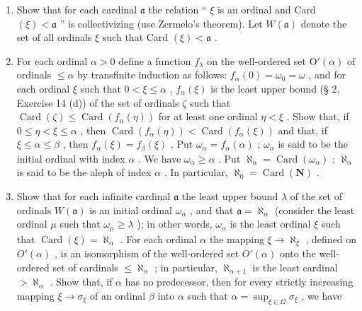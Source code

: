 \begin{enumerate}
\def\labelenumi{(\alph{enumi})}
\item
  Show that for each cardinal \(\mathfrak{a}\) the relation `` \(\xi\) is an ordinal and Card \((\xi) < \mathfrak{a}\) '' is collectivizing (use Zermelo's theorem). Let \(W(\mathfrak{a})\) denote the set of all ordinals \(\xi\) such that Card \((\xi) < \mathfrak{a}\) .
\item
  For each ordinal \(\alpha > 0\) define a function \(f_{\lambda}\) on the well-ordered set \(\mathrm{O}'(\alpha)\) of ordinals \(\leqslant \alpha\) by transfinite induction as follows: \(f_{\alpha}(0) = \omega_0 = \omega\) , and for each ordinal \(\xi\) such that \(0 < \xi \leqslant \alpha\) , \(f_{\alpha}(\xi)\) is the least upper bound (§ 2, Exercise 14 (d)) of the set of ordinals \(\zeta\) such that \(\operatorname{Card}(\zeta) \leqslant \operatorname{Card}(f_{\alpha}(\eta))\) for at least one ordinal \(\eta < \xi\) . Show that, if \(0 \leqslant \eta < \xi \leqslant \alpha\) , then \(\operatorname{Card}(f_{\alpha}(\eta)) < \operatorname{Card}(f_{\alpha}(\xi))\) and that, if \(\xi \leqslant \alpha \leqslant \beta\) , then \(f_{\alpha}(\xi) = f_{\beta}(\xi)\) . Put \(\omega_{\alpha} = f_{\alpha}(\alpha)\) ; \(\omega_{\alpha}\) is said to be the initial ordinal with index \(\alpha\) . We have \(\omega_{\alpha} \geqslant \alpha\) . Put \(\aleph_{\alpha} = \operatorname{Card}(\omega_{\alpha})\) ; \(\aleph_{\alpha}\) is said to be the aleph of index \(\alpha\) . In particular, \(\aleph_0 = \operatorname{Card}(\mathbf{N})\) .
\item
  Show that for each infinite cardinal \(\mathfrak{a}\) the least upper bound \(\lambda\) of the set of ordinals \(W(\mathfrak{a})\) is an initial ordinal \(\omega_{\alpha}\) , and that \(\mathfrak{a} = \aleph_{\alpha}\) (consider the least ordinal \(\mu\) such that \(\omega_{\mu} \geqslant \lambda\) ); in other words, \(\omega_{\alpha}\) is the least ordinal \(\xi\) such that \(\operatorname{Card}(\xi) = \aleph_{\alpha}\) . For each ordinal \(\alpha\) the mapping \(\xi \to \aleph_{\xi}\) , defined on \(O'(\alpha)\) , is an isomorphism of the well-ordered set \(O'(\alpha)\) onto the well-ordered set of cardinals \(\leqslant \aleph_{\alpha}\) ; in particular, \(\aleph_{\alpha+1}\) is the least cardinal \(> \aleph_{\alpha}\) . Show that, if \(\alpha\) has no predecessor, then for every strictly increasing mapping \(\xi \to \sigma_{\xi}\) of an ordinal \(\beta\) into \(\alpha\) such that \(\alpha = \sup_{\xi \in \Omega} \sigma_{\xi}\) , we have
\end{enumerate}

